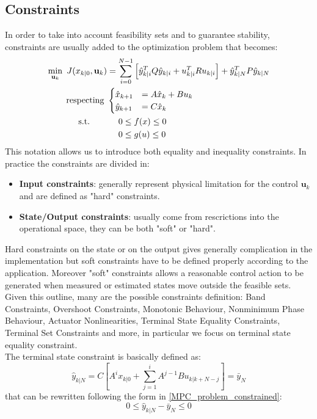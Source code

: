 \subsection{Constraints}

In order to take into account feasibility sets and to guarantee stability, constraints are usually added to the optimization problem that becomes: 
\begin{equation} \label{MPC_problem_constrained}
\begin{split}
		\min_{\textbf{u}_k}\ J(x_{k|0},\textbf{u}_k)&= \sum_{i=0}^{N-1} \left[\hat{y}_{k|i}^T Q \hat{y}_{k|i} + u_{k|i}^TRu_{k|i} \right] + \hat{y}_{k|N}^T P \hat{y}_{k|N} \\
		\textnormal{respecting}\ & 	
		\begin{cases}
			\hat{x}_{k+1}&=A\hat{x}_k+Bu_k \\
			\hat{y}_{k+1}&=C\hat{x}_k
		\end{cases} \\
		\textnormal{s.t.}\qquad
		&\ \ \ \ 0 \leq f(x)\leq 0 \\
		&\ \ \ \ 0 \leq g(u)\leq 0 \\
	\end{split}	
\end{equation}
This notation allows us to introduce both equality and inequality constraints. In practice the constraints are divided in: 
\begin{itemize}
 \item \textbf{Input constraints}: generally represent physical limitation for the control $\textbf{u}_k$ and are defined as "hard" constraints.
 	\item \textbf{State/Output constraints}: usually come from rescrictions into the operational space, they can be both "soft" or "hard".
\end{itemize} 
Hard constraints on the state or on the output gives generally complication in the implementation but soft constraints have to be defined properly according to the application. Moreover "soft" constraints allows a reasonable control action to be generated when measured or estimated states move outside the feasible sets.\\
Given this outline, many are the possible constraints definition: Band Constraints, Overshoot Constraints, Monotonic Behaviour, Nonminimum Phase Behaviour, Actuator Nonlinearities, Terminal State Equality Constraints, Terminal Set Constraints and more, in particular we focus on terminal state equality constraint.\\
The terminal state constraint is basically defined as: 
\begin{equation}
\hat{y}_{k|N}=C\left[A^i x_{k|0} + \sum_{j=1}^{i} A^{j-1}Bu_{k|k+N-j}\right]=\bar{y}_N
\end{equation}
that can be rewritten following the form in \eqref{MPC_problem_constrained}: 
\begin{equation}
0 \leq \hat{y}_{k|N}-\bar{y}_N \leq 0
\end{equation} 

